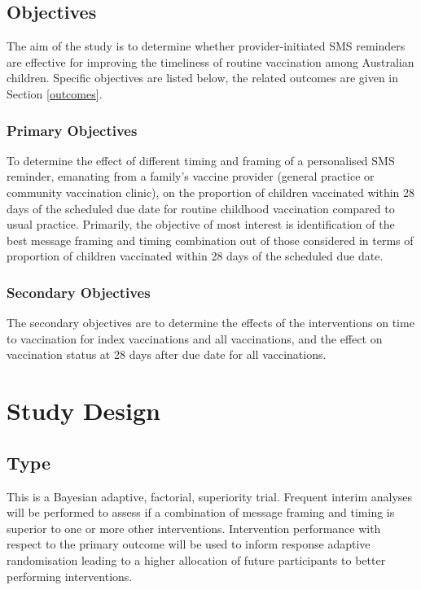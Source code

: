 \documentclass[
  bibliography=totoc]{scrreprt}
\begin{document}
\hypertarget{objectives}{%
\section{Objectives}\label{objectives}}

The aim of the study is to determine whether provider-initiated SMS reminders are effective for improving the timeliness of routine vaccination among Australian children.
Specific objectives are listed below, the related outcomes are given in Section \ref{outcomes}.

\hypertarget{primary-objectives}{%
\subsection{Primary Objectives}\label{primary-objectives}}

To determine the effect of different timing and framing of a personalised SMS reminder, emanating from a family's vaccine provider (general practice or community vaccination clinic), on the proportion of children vaccinated within 28 days of the scheduled due date for routine childhood vaccination compared to usual practice.
Primarily, the objective of most interest is identification of the best message framing and timing combination out of those considered in terms of proportion of children vaccinated within 28 days of the scheduled due date.

\hypertarget{secondary-objectives}{%
\subsection{Secondary Objectives}\label{secondary-objectives}}

The secondary objectives are to determine the effects of the interventions on time to vaccination for index vaccinations and all vaccinations, and the effect on vaccination status at 28 days after due date for all vaccinations.

\hypertarget{study-design}{%
\chapter{Study Design}\label{study-design}}

\hypertarget{type}{%
\section{Type}\label{type}}

This is a Bayesian adaptive, factorial, superiority trial.
Frequent interim analyses will be performed to assess if a combination of message framing and timing is superior to one or more other interventions.
Intervention performance with respect to the primary outcome will be used to inform response adaptive randomisation leading to a higher allocation of future participants to better performing interventions.
\end{document}
